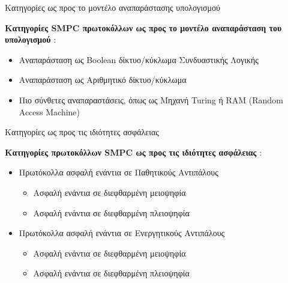 \documentclass[10pt]{beamer}
\begin{document}
    \begin{frame}[c]{Κατηγορίες ως προς το μοντέλο αναπαράστασης υπολογισμού}
        \centering
        \begin{block}{}
            \textbf{Κατηγορίες SMPC πρωτοκόλλων ως προς το μοντέλο αναπαράσταση του υπολογισμού} :
            \begin{itemize}
                \item Αναπαράσταση ως Boolean δίκτυο/κύκλωμα Συνδυαστικής Λογικής
                \item Αναπαράσταση ως Αριθμητικό δίκτυο/κύκλωμα
                \item Πιο σύνθετες αναπαραστάσεις, όπως ως Μηχανή Turing ή RAM (Random Access Machine)
            \end{itemize}
        \end{block}
    \end{frame}

    \begin{frame}[c]{Κατηγορίες ως προς τις ιδιότητες ασφάλειας}
        \centering
        \begin{block}{}
            \textbf{Κατηγορίες πρωτοκόλλων SMPC ως προς τις ιδιότητες ασφάλειας} :
            \begin{itemize}
                \item Πρωτόκολλα ασφαλή ενάντια σε Παθητικούς Αντιπάλους
                \begin{itemize}
                    \item Ασφαλή ενάντια σε διεφθαρμένη μειοψηφία
                    \item Ασφαλή ενάντια σε διεφθαρμένη πλειοψηφία
                \end{itemize}
                \item Πρωτόκολλα ασφαλή ενάντια σε Ενεργητικούς Αντιπάλους
                \begin{itemize}
                    \item Ασφαλή ενάντια σε διεφθαρμένη μειοψηφία
                    \item Ασφαλή ενάντια σε διεφθαρμένη πλειοψηφία
                \end{itemize}
            \end{itemize}
        \end{block}
    \end{frame}
\end{document}
